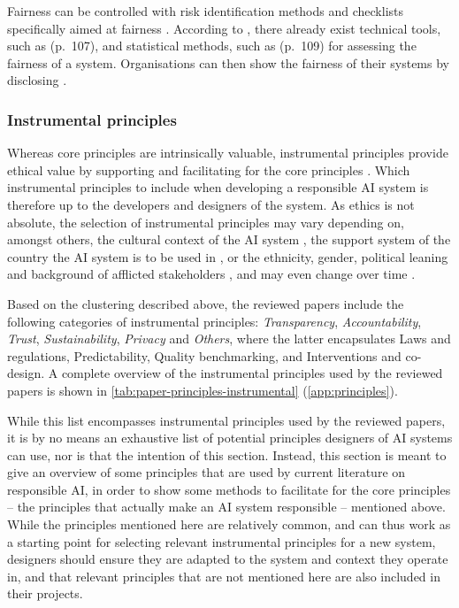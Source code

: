 Fairness can be controlled with risk identification methods and checklists specifically aimed at fairness \parencite[p.~103]{Lu_2022}. According to \textcite{Lu_2022}, there already exist technical tools, such as  (p.~107), and statistical methods, such as  (p.~109) for assessing the fairness of a system. Organisations can then show the fairness of their systems by disclosing  \parencite[p.~365]{Hacker_2022}.


\subsubsection{Instrumental principles}
Whereas core principles are intrinsically valuable, instrumental principles provide ethical value by supporting and facilitating for the core principles \parencite{Canca_2020}. Which instrumental principles to include when developing a responsible AI system is therefore up to the developers and designers of the system. As ethics is not absolute, the selection of instrumental principles may vary depending on, amongst others, the cultural context of the AI system \parencite{vanBruxvoort_2021}, the support system of the country the AI system is to be used in \parencite{Wright_2018}, or the ethnicity, gender, political leaning and background of afflicted stakeholders \parencite{Jakesch_2022}, and may even change over time \parencite{vanBruxvoort_2021}.

Based on the clustering described above, the reviewed papers include the following categories of instrumental principles: \textit{Transparency}, \textit{Accountability}, \textit{Trust}, \textit{Sustainability}, \textit{Privacy} and \textit{Others}, where the latter encapsulates Laws and regulations, Predictability, Quality benchmarking, and Interventions and co-design. A complete overview of the instrumental principles used by the reviewed papers is shown in \autoref{tab:paper-principles-instrumental} (\autoref{app:principles}).

While this list encompasses instrumental principles used by the reviewed papers, it
is by no means an exhaustive list of potential principles designers of AI systems can use, nor is that the intention of this section. Instead, this section is meant to give an overview of some principles that are used by current literature on responsible AI, in order to show some methods to facilitate for the core principles -- the principles that actually make an AI system responsible -- mentioned above. While the principles mentioned here are relatively common, and can thus work as a starting point for selecting relevant instrumental principles for a new system, designers should ensure they are adapted to the system and context they operate in, and that relevant principles that are not mentioned here are also included in their projects.


